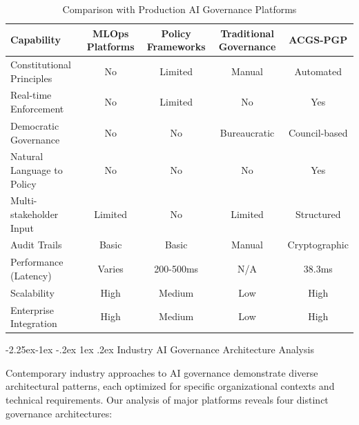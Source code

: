 \documentclass[manuscript,screen,9pt]{acmart}
\makeatletter
\renewcommand\subsection{\@startsection{subsection}{2}{\z@}%
  {-2.25ex\@plus -1ex \@minus -.2ex}%
  {1ex \@plus .2ex}%
  {\normalfont\large\bfseries}}
\newcommand{\tablesize}{\footnotesize}
\makeatother
\begin{document}
\begin{table}[ht]
	\centering
	\caption{Comparison with Production AI Governance Platforms}
	\label{tab:production_comparison}
	\tablesize
	\begin{tabular}{@{}lcccc@{}}
		\toprule
		\textbf{Capability}        & \textbf{MLOps Platforms} & \textbf{Policy Frameworks} & \textbf{Traditional Governance} & \textbf{ACGS-PGP} \\
		\midrule
		Constitutional Principles  & No                       & Limited                    & Manual                          & Automated         \\
		Real-time Enforcement      & No                       & Limited                    & No                              & Yes               \\
		Democratic Governance      & No                       & No                         & Bureaucratic                    & Council-based     \\
		Natural Language to Policy & No                       & No                         & No                              & Yes               \\
		Multi-stakeholder Input    & Limited                  & No                         & Limited                         & Structured        \\
		Audit Trails               & Basic                    & Basic                      & Manual                          & Cryptographic     \\
		Performance (Latency)      & Varies                   & 200-500ms                  & N/A                             & 38.3ms            \\
		Scalability                & High                     & Medium                     & Low                             & High              \\
		Enterprise Integration     & High                     & Medium                     & Low                             & High              \\
		\bottomrule
	\end{tabular}
\end{table}

\subsection{Industry AI Governance Architecture Analysis}
\label{subsec:industry_architecture_analysis}

Contemporary industry approaches to AI governance demonstrate diverse architectural patterns, each optimized for specific organizational contexts and technical requirements. Our analysis of major platforms reveals four distinct governance architectures:
\end{document}
